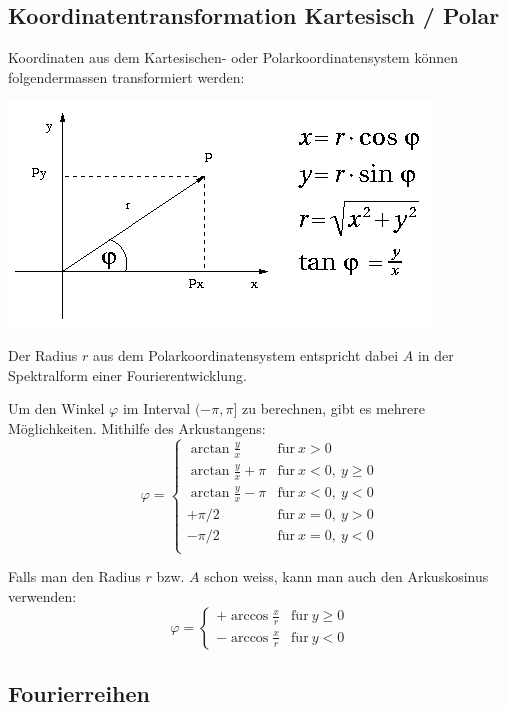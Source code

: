 \documentclass[10pt,a4paper]{scrartcl}
\begin{document}
\subsection{Koordinatentransformation Kartesisch / Polar}

Koordinaten aus dem Kartesischen- oder Polarkoordinatensystem können
folgendermassen transformiert werden:

\begin{center}
\includegraphics[scale=0.5]{img/Koordinatentransformation.png}
\end{center}

Der Radius $r$ aus dem Polarkoordinatensystem entspricht dabei $A$ in der
Spektralform einer Fourierentwicklung.

Um den Winkel $\varphi$ im Interval $(-\pi, \pi]$ zu berechnen, gibt es mehrere
Möglichkeiten. Mithilfe des Arkustangens:
$$\varphi = \begin{cases}
\arctan\frac{y}{x} & \mathrm{f\ddot ur}\ x > 0\\
\arctan\frac{y}{x} + \pi & \mathrm{f\ddot ur}\ x < 0,\ y \geq 0\\
\arctan\frac{y}{x} - \pi & \mathrm{f\ddot ur}\ x < 0,\ y < 0\\
+\pi/2 & \mathrm{f\ddot ur}\ x = 0,\ y > 0\\
-\pi/2 & \mathrm{f\ddot ur}\ x = 0,\ y < 0\\
\end{cases}$$

Falls man den Radius $r$ bzw. $A$ schon weiss, kann man auch den Arkuskosinus verwenden:
$$\varphi = \begin{cases}
+\arccos\frac{x}{r} & \mathrm{f\ddot ur}\ y\geq 0\\
-\arccos\frac{x}{r} & \mathrm{f\ddot ur}\ y<0
\end{cases}$$


\subsection{Fourierreihen}
\end{document}
